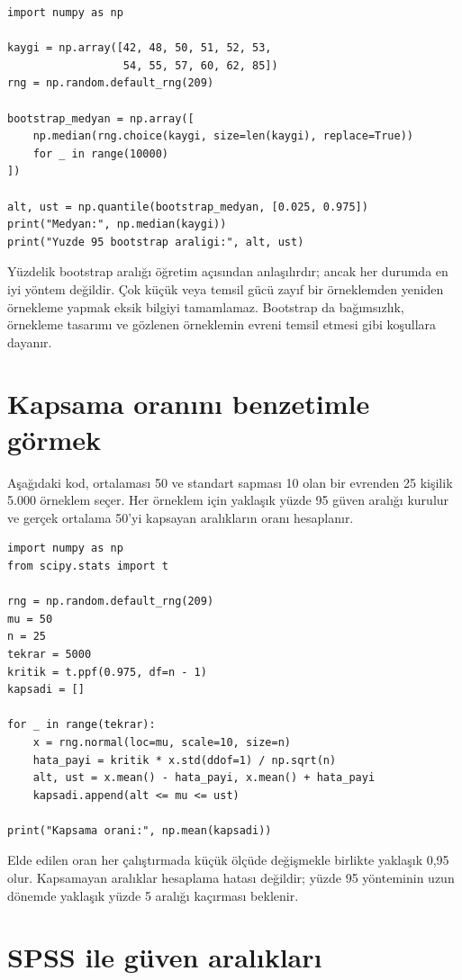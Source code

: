 \begin{lstlisting}
import numpy as np

kaygi = np.array([42, 48, 50, 51, 52, 53,
                  54, 55, 57, 60, 62, 85])
rng = np.random.default_rng(209)

bootstrap_medyan = np.array([
    np.median(rng.choice(kaygi, size=len(kaygi), replace=True))
    for _ in range(10000)
])

alt, ust = np.quantile(bootstrap_medyan, [0.025, 0.975])
print("Medyan:", np.median(kaygi))
print("Yuzde 95 bootstrap araligi:", alt, ust)
\end{lstlisting}

Yüzdelik bootstrap aralığı öğretim açısından anlaşılırdır; ancak her durumda
en iyi yöntem değildir. Çok küçük veya temsil gücü zayıf bir örneklemden
yeniden örnekleme yapmak eksik bilgiyi tamamlamaz. Bootstrap da bağımsızlık,
örnekleme tasarımı ve gözlenen örneklemin evreni temsil etmesi gibi koşullara
dayanır.

\section{Kapsama oranını benzetimle görmek}

Aşağıdaki kod, ortalaması 50 ve standart sapması 10 olan bir evrenden 25
kişilik 5.000 örneklem seçer. Her örneklem için yaklaşık yüzde 95 güven aralığı
kurulur ve gerçek ortalama 50'yi kapsayan aralıkların oranı hesaplanır.

\begin{lstlisting}
import numpy as np
from scipy.stats import t

rng = np.random.default_rng(209)
mu = 50
n = 25
tekrar = 5000
kritik = t.ppf(0.975, df=n - 1)
kapsadi = []

for _ in range(tekrar):
    x = rng.normal(loc=mu, scale=10, size=n)
    hata_payi = kritik * x.std(ddof=1) / np.sqrt(n)
    alt, ust = x.mean() - hata_payi, x.mean() + hata_payi
    kapsadi.append(alt <= mu <= ust)

print("Kapsama orani:", np.mean(kapsadi))
\end{lstlisting}

Elde edilen oran her çalıştırmada küçük ölçüde değişmekle birlikte yaklaşık
0,95 olur. Kapsamayan aralıklar hesaplama hatası değildir; yüzde 95 yönteminin
uzun dönemde yaklaşık yüzde 5 aralığı kaçırması beklenir.

\section{SPSS ile güven aralıkları}

